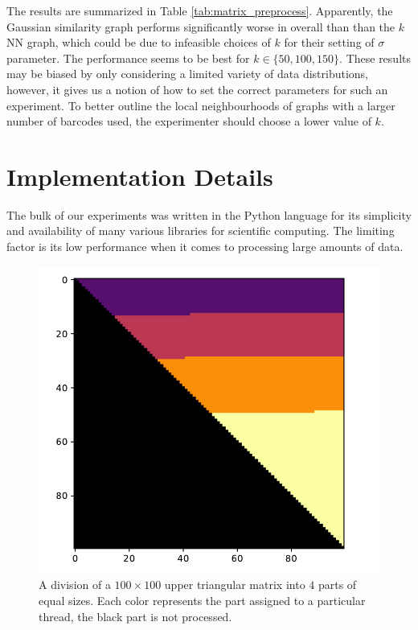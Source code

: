 The results are summarized in Table \ref{tab:matrix_preprocess}. Apparently, the Gaussian similarity graph performs significantly worse in overall than than the $k$NN graph, which could be due to infeasible choices of $k$ for their setting of $\sigma$ parameter. The performance seems to be best for $k \in \{50, 100, 150\}$. These results may be biased by only considering a limited variety of data distributions, however, it gives us a notion of how to set the correct parameters for such an experiment. To better outline the local neighbourhoods of graphs with a larger number of barcodes used, the experimenter should choose a lower value of $k$.


\section{Implementation Details}
The bulk of our experiments was written in the Python language for its simplicity and availability of many various libraries for scientific computing. The limiting factor is its low performance when it comes to processing large amounts of data. 

\begin{figure}
    \centering
    \includegraphics[scale=0.8]{images/equiload_100.pdf}
  \caption[LDTW matrix parallelization ]{A division of a $100 \times 100$ upper triangular matrix into $4$ parts of equal sizes. Each color represents the part assigned to a particular thread, the black part is not processed.}
  \label{fig:equiload_100}
\end{figure}

